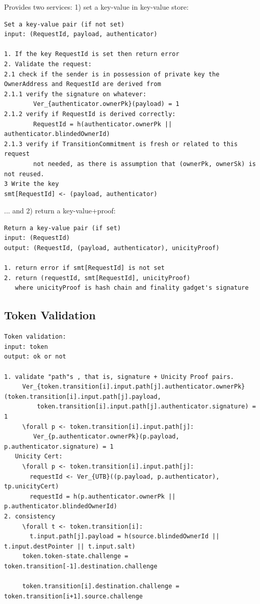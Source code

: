 \documentclass{article}
\begin{document}
Provides two services: 1) set a key-value in key-value store:

\begin{lstlisting}
Set a key-value pair (if not set)
input: (RequestId, payload, authenticator)

1. If the key RequestId is set then return error
2. Validate the request:
2.1 check if the sender is in possession of private key the OwnerAddress and RequestId are derived from
2.1.1 verify the signature on whatever:
        Ver_{authenticator.ownerPk}(payload) = 1
2.1.2 verify if RequestId is derived correctly:
        RequestId = h(authenticator.ownerPk || authenticator.blindedOwnerId)
2.1.3 verify if TransitionCommitment is fresh or related to this request
        not needed, as there is assumption that (ownerPk, ownerSk) is not reused.
3 Write the key
smt[RequestId] <- (payload, authenticator)
\end{lstlisting}

... and 2) return a key-value+proof:

\begin{lstlisting}
Return a key-value pair (if set)
input: (RequestId)
output: (RequestId, (payload, authenticator), unicityProof)

1. return error if smt[RequestId] is not set
2. return (requestId, smt[RequestId], unicityProof)
   where unicityProof is hash chain and finality gadget's signature
\end{lstlisting}



\subsection{Token Validation}

\begin{lstlisting}
Token validation:
input: token
output: ok or not

1. validate "path"s , that is, signature + Unicity Proof pairs.
     Ver_{token.transition[i].input.path[j].authenticator.ownerPk}(token.transition[i].input.path[j].payload,
         token.transition[i].input.path[j].authenticator.signature) = 1
     \forall p <- token.transition[i].input.path[j]:
        Ver_{p.authenticator.ownerPk}(p.payload, p.authenticator.signature) = 1
   Unicity Cert:
     \forall p <- token.transition[i].input.path[j]:
       requestId <- Ver_{UTB}((p.payload, p.authenticator), tp.unicityCert)
       requestId = h(p.authenticator.ownerPk || p.authenticator.blindedOwnerId)
2. consistency
     \forall t <- token.transition[i]:
       t.input.path[j].payload = h(source.blindedOwnerId || t.input.destPointer || t.input.salt)
     token.token-state.challenge = token.transition[-1].destination.challenge

     token.transition[i].destination.challenge = token.transition[i+1].source.challenge


\end{lstlisting}
\end{document}
